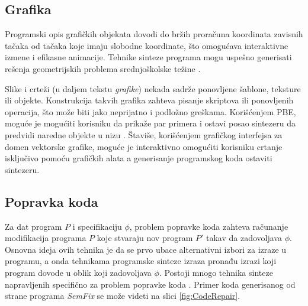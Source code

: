 \subsection{Grafika}
\label{subsec:Grafika}

Programski opis grafičkih objekata dovodi do bržih proračuna koordinata zavisnih tačaka od tačaka koje imaju slobodne koordinate, što omogućava interaktivne izmene i efikasne animacije. Tehnike sinteze programa mogu uspešno generisati rešenja geometrijskih problema sre\-dnjo\-ško\-lske težine \cite{SynthesizingGeometryConstructions}.

Slike i crteži (u daljem tekstu \emph{grafike}) nekada sadrže ponovljene šablone, teksture ili objekte. Konstrukcija takvih grafika zahteva pisanje skriptova ili ponovljenih operacija, što može biti jako neprijatno i podložno greškama. Korišćenjem PBE, moguće je mogućiti korisniku da prikaže par primera i ostavi posao sintezeru da predvidi naredne objekte u nizu \cite{Backpropagation}. Štaviše, korišćenjem grafičkog interfejsa za domen vektorske grafike, moguće je interaktivno omogućiti korisniku crtanje isključivo pomoću grafičkih alata a generisanje programskog koda ostaviti sintezeru.


\subsection{Popravka koda}
\label{subsec:PopravkaKoda}

Za dat program $P$ i specifikaciju $\phi$, problem popravke koda zahteva ra\-ču\-na\-nje modifikacija programa $P$ koje stvaraju nov program $P'$ takav da zadovoljava $\phi$. Osnovna ideja ovih tehnika je da se prvo ubace alternativni izbori za izraze u programu, a onda tehnikama programske sinteze izraza pronađu izrazi koji program dovode u oblik koji zadovoljava $\phi$. Postoji mnogo tehnika sinteze napravljenih specifično za problem popravke koda \cite{Qlose, ProgramRepairAsAGame}. Primer koda generisanog od strane programa \emph{SemFix} \cite{SemFix} se može videti na slici \ref{fig:CodeRepair}.

